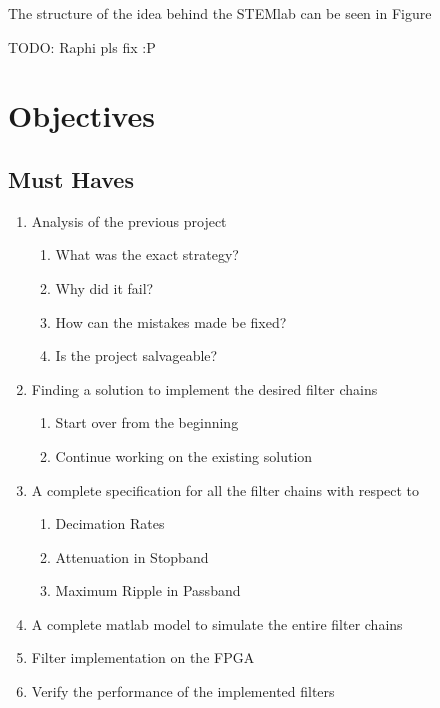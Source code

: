 \documentclass[a4paper,oneside]{alpenspecs/alpenspecs}
\begin{document}
The structure of the idea behind the STEMlab can be seen in Figure~\label{fig:system}

TODO: Raphi pls fix :P
%     

\chapter{Objectives} %
\label{ch:objectives}

\section{Must Haves}
    \begin{enumerate}
        \item Analysis of the previous project
        \begin{enumerate}
            \item What was the exact strategy?
            \item Why did it fail?
            \item How can the mistakes made be fixed?
            \item Is the project salvageable?
        \end{enumerate}
            \item Finding a solution to implement the desired filter chains
        \begin{enumerate}    
            \item Start over from the beginning
            \item Continue working on the existing solution
        \end{enumerate}
            \item A complete specification for all the filter chains with respect to
        \begin{enumerate}
            \item Decimation Rates
            \item Attenuation in Stopband
            \item Maximum Ripple in Passband
        \end{enumerate}
        \item A complete matlab model to simulate the entire filter chains
        \item Filter implementation on the FPGA
        \item Verify the performance of the implemented filters
    \end{enumerate}
\end{document}
